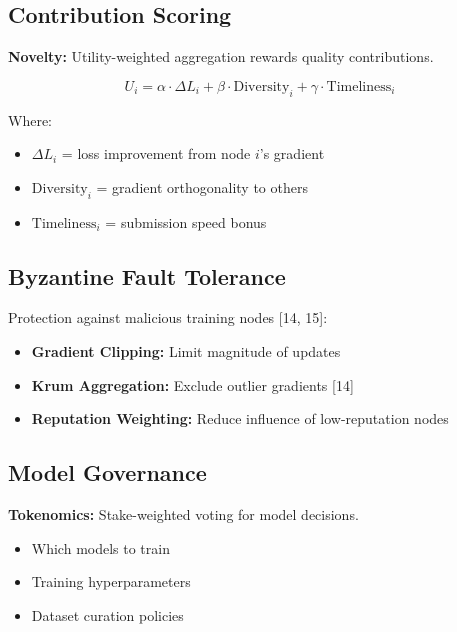 \documentclass[11pt,a4paper]{article}
\begin{document}
\subsection{Contribution Scoring}

\textbf{Novelty:} Utility-weighted aggregation rewards quality contributions.

\begin{equation}
U_i = \alpha \cdot \Delta L_i + \beta \cdot \text{Diversity}_i + \gamma \cdot \text{Timeliness}_i
\end{equation}

Where:
\begin{itemize}
    \item $\Delta L_i$ = loss improvement from node $i$'s gradient
    \item $\text{Diversity}_i$ = gradient orthogonality to others
    \item $\text{Timeliness}_i$ = submission speed bonus
\end{itemize}

\subsection{Byzantine Fault Tolerance}

Protection against malicious training nodes [14, 15]:

\begin{itemize}
    \item \textbf{Gradient Clipping:} Limit magnitude of updates
    \item \textbf{Krum Aggregation:} Exclude outlier gradients [14]
    \item \textbf{Reputation Weighting:} Reduce influence of low-reputation nodes
\end{itemize}

\subsection{Model Governance}

\textbf{Tokenomics:} Stake-weighted voting for model decisions.

\begin{itemize}
    \item Which models to train
    \item Training hyperparameters
    \item Dataset curation policies
\end{itemize}
\end{document}
